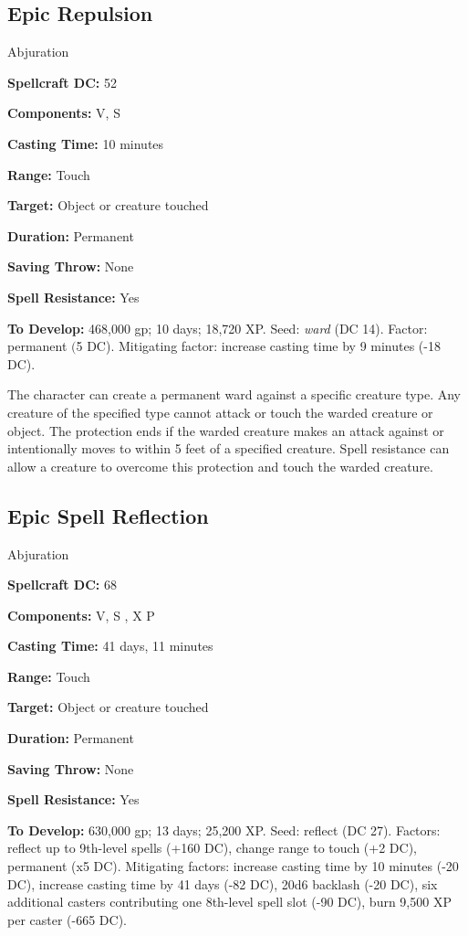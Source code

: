 \documentclass{article}
\begin{document}
\vspace{12pt}
\subsection*{Epic Repulsion }

Abjuration 

\textbf{Spellcraft DC:} 52 

\textbf{Components:} V, S 

\textbf{Casting Time:} 10 minutes 

\textbf{Range:} Touch 

\textbf{Target:} Object or creature touched 

\textbf{Duration:} Permanent 

\textbf{Saving Throw:} None 

\textbf{Spell Resistance:} Yes 

\textbf{To Develop:} 468,000 gp; 10 days; 18,720 XP. Seed: \textit{ward }(DC 14). 
Factor: permanent $($5 DC). Mitigating factor: increase casting time by 9 minutes 
(-18 DC). 

The character can create a permanent ward against a specific creature type. Any 
creature of the specified type cannot attack or touch the warded creature or object. 
The protection ends if the warded creature makes an attack against or intentionally 
moves to within 5 feet of a specified creature. Spell resistance can allow a creature 
to overcome this protection and touch the warded creature. 

\vspace{12pt}
\subsection*{Epic Spell Reflection }

Abjuration

\textbf{Spellcraft DC:} 68 

\textbf{Components:} V, S , X P 

\textbf{Casting Time:} 41 days, 11 minutes 

\textbf{Range:} Touch 

\textbf{Target:} Object or creature touched 

\textbf{Duration:} Permanent 

\textbf{Saving Throw:} None 

\textbf{Spell Resistance:} Yes 

\baselineskip=12pt
\textbf{To Develop:} 630,000 gp; 13 days; 25,200 XP. Seed: reflect (DC 27). Factors: 
reflect up to 9th-level spells (+160 DC), change range to touch (+2 DC), permanent 
(x5 DC). Mitigating factors: increase casting time by 10 minutes (-20 DC), increase 
casting time by 41 days (-82 DC), 20d6 backlash (-20 DC), six additional casters 
contributing one 8th-level spell slot (-90 DC), burn 9,500 XP per caster (-665 
DC).
\end{document}
